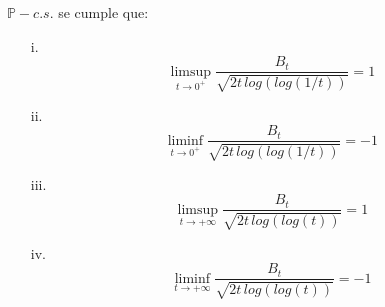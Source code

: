 \begin{teorema}
$\mathbb{P}-c.s.$ se cumple que:
\begin{itemize}
    \item[i.] 
    \[\limsup_{t\rightarrow 0^+} \frac{B_t}{\sqrt{2t\,log\left(log(1/t)\right)}} = 1\]
    \item[ii.]
    \[\liminf_{t\rightarrow 0^+} \frac{B_t}{\sqrt{2t\,log\left(log(1/t)\right)}} = -1\]
    \item[iii.]
    \[\limsup_{t\rightarrow +\infty} \frac{B_t}{\sqrt{2t\,log\left(log(t)\right)}} = 1\]
    \item[iv.]
    \[\liminf_{t\rightarrow +\infty} \frac{B_t}{\sqrt{2t\,log\left(log(t)\right)}} = -1\]
\end{itemize}

\end{teorema}

